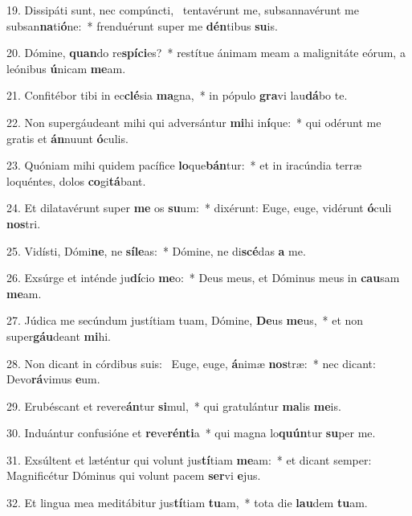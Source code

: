19. Dissipáti sunt, nec compúncti, \dag\  tentavérunt me, subsannavérunt me subsan\textbf{na}ti\textbf{ó}ne:~*  frenduérunt super me \textbf{dén}tibus \textbf{su}is.\

20. Dómine, \textbf{quan}do re\textbf{spí}\textbf{ci}es?~*  restítue ánimam meam a malignitáte eórum, a leónibus \textbf{ú}nicam \textbf{me}am.\

21. Confitébor tibi in ec\textbf{clé}sia \textbf{ma}gna,~*  in pópulo \textbf{gra}vi lau\textbf{dá}bo te.\

22. Non supergáudeant mihi qui adversántur \textbf{mi}hi in\textbf{í}que:~*  qui odérunt me gratis et \textbf{án}nuunt \textbf{ó}culis.\

23. Quóniam mihi quidem pacífice \textbf{lo}que\textbf{bán}tur:~*  et in iracúndia terræ loquéntes, dolos \textbf{co}gi\textbf{tá}bant.\

24. Et dilatavérunt super \textbf{me} os \textbf{su}um:~*  dixérunt: Euge, euge, vidérunt \textbf{ó}culi \textbf{nos}tri.\

25. Vidísti, Dómi\textbf{ne}, ne \textbf{sí}\textbf{le}as:~*  Dómine, ne di\textbf{scé}das \textbf{a} me.\

26. Exsúrge et inténde ju\textbf{dí}cio \textbf{me}o:~*  Deus meus, et Dóminus meus in \textbf{cau}sam \textbf{me}am.\

27. Júdica me secúndum justítiam tuam, Dómine, \textbf{De}us \textbf{me}us,~*  et non super\textbf{gáu}deant \textbf{mi}hi.\

28. Non dicant in córdibus suis: \dag\  Euge, euge, \textbf{á}nimæ \textbf{nos}træ:~*  nec dicant: Devo\textbf{rá}vimus \textbf{e}um.\

29. Erubéscant et revere\textbf{án}tur \textbf{si}mul,~*  qui gratulántur \textbf{ma}lis \textbf{me}is.\

30. Induántur confusióne et \textbf{re}ve\textbf{rén}\textbf{ti}a~*  qui magna lo\textbf{quún}tur \textbf{su}per me.\

31. Exsúltent et læténtur qui volunt jus\textbf{tí}tiam \textbf{me}am:~*  et dicant semper: Magnificétur Dóminus qui volunt pacem \textbf{ser}vi \textbf{e}jus.\

32. Et lingua mea meditábitur jus\textbf{tí}tiam \textbf{tu}am,~*  tota die \textbf{lau}dem \textbf{tu}am.\

